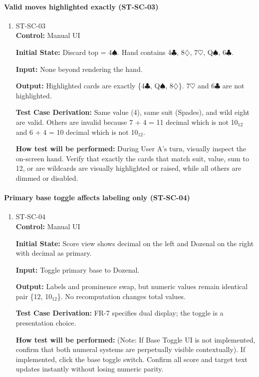 \documentclass[12pt, titlepage]{article}
\begin{document}
\paragraph{Valid moves highlighted exactly (ST-SC-03)}
\begin{enumerate}
\item{ST-SC-03\\}
\textbf{Control:} Manual UI

\textbf{Initial State:} Discard top = 4$\spadesuit$. Hand contains 4$\clubsuit$, 8$\diamondsuit$, 7$\heartsuit$, Q$\spadesuit$, 6$\clubsuit$.

\textbf{Input:} None beyond rendering the hand.

\textbf{Output:} Highlighted cards are exactly \{4$\clubsuit$, Q$\spadesuit$, 8$\diamondsuit$\}. 7$\heartsuit$ and 6$\clubsuit$ are not highlighted.

\textbf{Test Case Derivation:} Same value (4), same suit (Spades), and wild eight are valid. Others are invalid because 7 + 4 = 11 decimal which is not 10$_{12}$ and 6 + 4 = 10 decimal which is not 10$_{12}$.

\textbf{How test will be performed:} During User A's turn, visually inspect the on-screen hand. Verify that exactly the cards that match suit, value, sum to 12, or are wildcards are visually highlighted or raised, while all others are dimmed or disabled.
\end{enumerate}

\paragraph{Primary base toggle affects labeling only (ST-SC-04)}
\begin{enumerate}
\item{ST-SC-04\\}
\textbf{Control:} Manual UI

\textbf{Initial State:} Score view shows decimal on the left and Dozenal on the right with decimal as primary.

\textbf{Input:} Toggle primary base to Dozenal.

\textbf{Output:} Labels and prominence swap, but numeric values remain identical pair \{12, 10$_{12}$\}. No recomputation changes total values.

\textbf{Test Case Derivation:} FR-7 specifies dual display; the toggle is a presentation choice.

\textbf{How test will be performed:} (Note: If Base Toggle UI is not implemented, confirm that both numeral systems are perpetually visible contextually). If implemented, click the base toggle switch. Confirm all score and target text updates instantly without losing numeric parity.
\end{enumerate}
\end{document}
